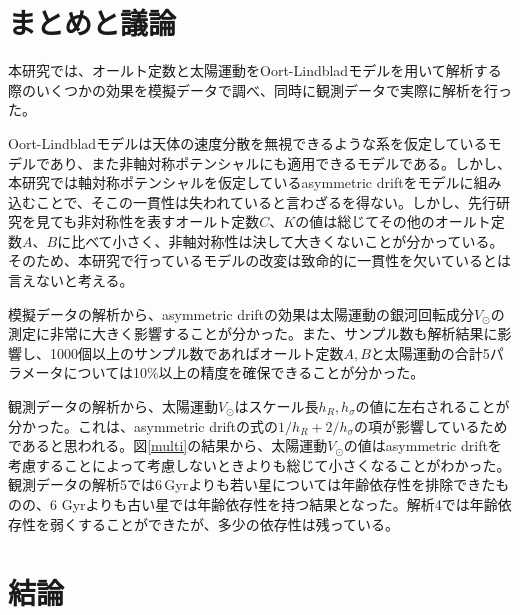 \chapter{まとめと議論 \label{chapSummary}}
本研究では、オールト定数と太陽運動をOort-Lindbladモデルを用いて解析する際のいくつかの効果を模擬データで調べ、同時に観測データで実際に解析を行った。

Oort-Lindbladモデルは天体の速度分散を無視できるような系を仮定しているモデルであり、また非軸対称ポテンシャルにも適用できるモデルである。しかし、本研究では軸対称ポテンシャルを仮定しているasymmetric driftをモデルに組み込むことで、そこの一貫性は失われていると言わざるを得ない。しかし、先行研究を見ても非対称性を表すオールト定数$C、K$の値は総じてその他のオールト定数$A、B$に比べて小さく、非軸対称性は決して大きくないことが分かっている。そのため、本研究で行っているモデルの改変は致命的に一貫性を欠いているとは言えないと考える。

模擬データの解析から、asymmetric driftの効果は太陽運動の銀河回転成分$V_{\odot}$の測定に非常に大きく影響することが分かった。また、サンプル数も解析結果に影響し、1000個以上のサンプル数であればオールト定数$A,B$と太陽運動の合計5パラメータについては10\%以上の精度を確保できることが分かった。

観測データの解析から、太陽運動$V_{\odot}$はスケール長$h_R,h_{\sigma}$の値に左右されることが分かった。これは、asymmetric driftの式の$1/h_R + 2/h_{\sigma}$の項が影響しているためであると思われる。図\ref{multi}の結果から、太陽運動$V_{\odot}$の値はasymmetric driftを考慮することによって考慮しないときよりも総じて小さくなることがわかった。観測データの解析5では6\,Gyrよりも若い星については年齢依存性を排除できたものの、6 Gyrよりも古い星では年齢依存性を持つ結果となった。解析4では年齢依存性を弱くすることができたが、多少の依存性は残っている。

\chapter{結論}
